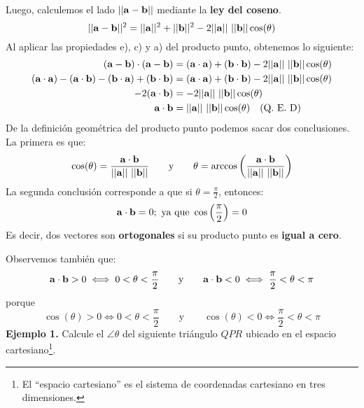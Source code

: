 \documentclass[12pt]{article}
\begin{document}
Luego, calculemos el lado $||\mathbf{a} - \mathbf{b}||$ mediante la \textbf{ley del coseno}.
\[
  ||\vecmat{a} - \vecmat{b}||^{2} = ||\vecmat{a}||^{2} + ||\vecmat{b}||^{2} - 2 ||\vecmat{a}|| \ ||\vecmat{b}|| \cos(\theta)
\]
Al aplicar las propiedades e), c) y a) del producto punto, obtenemos lo siguiente:
\begin{align*}
  (\mathbf{a} - \mathbf{b}) \cdot (\mathbf{a} - \mathbf{b}) &= (\mathbf{a} \cdot \mathbf{a}) + (\mathbf{b} \cdot \mathbf{b})
                                                              - 2 ||\mathbf{a}|| \ ||\mathbf{b}|| \cos(\theta) \\
  (\mathbf{a} \cdot \mathbf{a}) - (\mathbf{a} \cdot \mathbf{b}) -
  (\mathbf{b} \cdot \mathbf{a}) + (\mathbf{b} \cdot \mathbf{b}) &= (\mathbf{a} \cdot \mathbf{a}) + (\mathbf{b} \cdot \mathbf{b})
                                                                    - 2 ||\mathbf{a}|| \ ||\mathbf{b}|| \cos(\theta) \\
                                -2(\mathbf{a} \cdot \mathbf{b}) &= -2 ||\mathbf{a}|| \ ||\mathbf{b}|| \cos(\theta) \\
                                    \mathbf{a} \cdot \mathbf{b} &= ||\mathbf{a}|| \ ||\mathbf{b}|| \cos(\theta) \quad \text{(Q. E. D)}
\end{align*}
De la definición geométrica del producto punto podemos sacar dos conclusiones. La primera es que:
\[
  \cos(\theta) = \frac{\mathbf{a} \cdot \mathbf{b}}{||\mathbf{a}|| \ ||\mathbf{b}||}
  \qquad \text{y} \qquad
  \theta = \arccos\left(\frac{\mathbf{a} \cdot \mathbf{b}}{||\mathbf{a}|| \ ||\mathbf{b}||}\right)
\]
La segunda conclusión corresponde a que si $\theta = \frac{\pi}{2}$, entonces:
\[
  \mathbf{a} \cdot \mathbf{b} = 0; \text{ ya que } \cos\left(\frac{\pi}{2}\right) = 0
\]
Es decir, dos vectores son \textbf{ortogonales} si su producto punto es \textbf{igual a cero}.

Observemos también que:
\[
  \mathbf{a} \cdot \mathbf{b} > 0 \iff 0 < \theta < \frac{\pi}{2}
  \qquad \text{y} \qquad
  \mathbf{a} \cdot \mathbf{b} < 0 \iff \frac{\pi}{2} < \theta < \pi
\]
porque
\[
  \cos(\theta) > 0 \iff 0 < \theta < \frac{\pi}{2}
  \qquad \text{y} \qquad
  \cos(\theta) < 0 \iff \frac{\pi}{2} < \theta < \pi
\]
\textbf{Ejemplo 1.} Calcule el $\angle \theta$ del siguiente triángulo $QPR$ ubicado en el espacio cartesiano\footnote{El ``espacio cartesiano'' es el sistema de coordenadas cartesiano en tres dimensiones.}.
\end{document}
